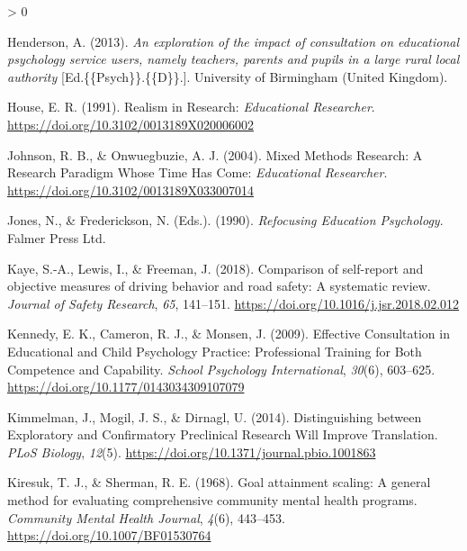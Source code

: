 \documentclass[
  english,
  man]{apa7}
\newlength{\cslhangindent}
\newenvironment{CSLReferences}[2] %
 {%
  \setlength{\parindent}{0pt}
  \ifodd #1 \everypar{\setlength{\hangindent}{\cslhangindent}}\ignorespaces\fi
  \ifnum #2 > 0
  \setlength{\parskip}{#2\baselineskip}
  \fi
 }%
 {}
\begin{document}
\begin{CSLReferences}{1}{0}
\leavevmode\hypertarget{ref-hendersonExplorationImpactConsultation2013}{}%
Henderson, A. (2013). \emph{An exploration of the impact of consultation on educational psychology service users, namely teachers, parents and pupils in a large rural local authority} {[}Ed.\{\{Psych\}\}.\{\{D\}\}.{]}. University of Birmingham (United Kingdom).

\leavevmode\hypertarget{ref-houseRealismResearch1991}{}%
House, E. R. (1991). Realism in {Research}: \emph{Educational Researcher}. \url{https://doi.org/10.3102/0013189X020006002}

\leavevmode\hypertarget{ref-johnsonMixedMethodsResearch2004a}{}%
Johnson, R. B., \& Onwuegbuzie, A. J. (2004). Mixed {Methods Research}: {A Research Paradigm Whose Time Has Come}: \emph{Educational Researcher}. \url{https://doi.org/10.3102/0013189X033007014}

\leavevmode\hypertarget{ref-jonesRefocusingEducationPsychology1990}{}%
Jones, N., \& Frederickson, N. (Eds.). (1990). \emph{Refocusing {Education Psychology}}. {Falmer Press Ltd}.

\leavevmode\hypertarget{ref-kayeComparisonSelfreportObjective2018}{}%
Kaye, S.-A., Lewis, I., \& Freeman, J. (2018). Comparison of self-report and objective measures of driving behavior and road safety: {A} systematic review. \emph{Journal of Safety Research}, \emph{65}, 141--151. \url{https://doi.org/10.1016/j.jsr.2018.02.012}

\leavevmode\hypertarget{ref-kennedyEffectiveConsultationEducational2009a}{}%
Kennedy, E. K., Cameron, R. J., \& Monsen, J. (2009). Effective {Consultation} in {Educational} and {Child Psychology Practice}: {Professional Training} for {Both Competence} and {Capability}. \emph{School Psychology International}, \emph{30}(6), 603--625. \url{https://doi.org/10.1177/0143034309107079}

\leavevmode\hypertarget{ref-kimmelmanDistinguishingExploratoryConfirmatory2014}{}%
Kimmelman, J., Mogil, J. S., \& Dirnagl, U. (2014). Distinguishing between {Exploratory} and {Confirmatory Preclinical Research Will Improve Translation}. \emph{PLoS Biology}, \emph{12}(5). \url{https://doi.org/10.1371/journal.pbio.1001863}

\leavevmode\hypertarget{ref-kiresukGoalAttainmentScaling1968}{}%
Kiresuk, T. J., \& Sherman, R. E. (1968). Goal attainment scaling: {A} general method for evaluating comprehensive community mental health programs. \emph{Community Mental Health Journal}, \emph{4}(6), 443--453. \url{https://doi.org/10.1007/BF01530764}


\end{CSLReferences}
\end{document}
